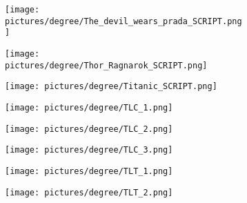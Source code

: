 \begin{figure} \ContinuedFloat
        \centering
        \begin{subfigure}{.49\textwidth}
                \centering
                \texttt{[image: pictures/degree/The\_devil\_wears\_prada\_SCRIPT.png]}
        \end{subfigure}
        \begin{subfigure}{.49\textwidth}
                \centering
                \texttt{[image: pictures/degree/Thor\_Ragnarok\_SCRIPT.png]}
        \end{subfigure}
\end{figure}
\begin{figure} \ContinuedFloat
        \centering
        \begin{subfigure}{.49\textwidth}
                \centering
                \texttt{[image: pictures/degree/Titanic\_SCRIPT.png]}
        \end{subfigure}
        \begin{subfigure}{.49\textwidth}
                \centering
                \texttt{[image: pictures/degree/TLC\_1.png]}
        \end{subfigure}
\end{figure}
\begin{figure} \ContinuedFloat
        \centering
        \begin{subfigure}{.49\textwidth}
                \centering
                \texttt{[image: pictures/degree/TLC\_2.png]}
        \end{subfigure}
        \begin{subfigure}{.49\textwidth}
                \centering
                \texttt{[image: pictures/degree/TLC\_3.png]}
        \end{subfigure}
\end{figure}
\begin{figure} \ContinuedFloat
        \centering
        \begin{subfigure}{.49\textwidth}
                \centering
                \texttt{[image: pictures/degree/TLT\_1.png]}
        \end{subfigure}
        \begin{subfigure}{.49\textwidth}
                \centering
                \texttt{[image: pictures/degree/TLT\_2.png]}
        \end{subfigure}
\end{figure}
